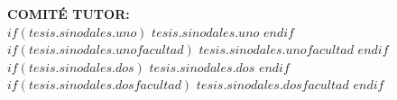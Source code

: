 \begin{titlepage}
\begin{center}
        {\small \textbf{COMITÉ TUTOR:}}\\
        {\small $if(tesis.sinodales.uno)$ $tesis.sinodales.uno$ $endif$}\\
        {\small $if(tesis.sinodales.unofacultad)$ $tesis.sinodales.unofacultad$ $endif$}\\[0.3cm]
        {\small $if(tesis.sinodales.dos)$ $tesis.sinodales.dos$ $endif$}\\
        {\small $if(tesis.sinodales.dosfacultad)$ $tesis.sinodales.dosfacultad$ $endif$}\\[1cm]
        
        
    \end{center}
\end{titlepage}


\newpage
\begin{center}
\end{center}

\newpage
\begin{center}
\end{center}


